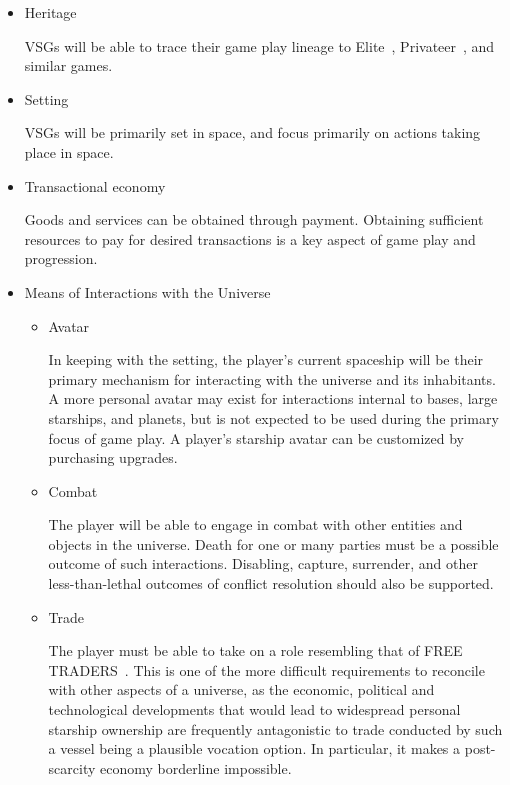 \begin{itemize}

\item Heritage

VSGs will be able to trace their game play lineage to Elite~\cite{Elite},
Privateer~\cite{Privateer}, and similar games.

\item Setting

VSGs will be primarily set in space, and focus primarily on actions
taking place in space.

\item Transactional economy

Goods and services can be obtained through payment. Obtaining
sufficient resources to pay for desired transactions is a key aspect
of game play and progression.

\item Means of Interactions with the Universe

\begin{itemize}
\item Avatar

In keeping with the setting, the player's current spaceship will be
their primary mechanism for interacting with the universe and its
inhabitants. A more personal avatar may exist for interactions
internal to bases, large starships, and planets, but is not expected
to be used during the primary focus of game play. A player's
starship avatar can be customized by purchasing upgrades.

\item Combat

The player will be able to engage in combat with other entities and
objects in the universe. Death for one or many parties must be a
possible outcome of such interactions. Disabling, capture, surrender,
and other less-than-lethal outcomes of conflict resolution should also
be supported.

\item Trade

The player must be able to take on a role resembling that of FREE
TRADERS~\cite{TOUGHGUIDE}. This is one of the more difficult
requirements to reconcile with other aspects of a universe, as the
economic, political and technological developments that would lead to
widespread personal starship ownership are frequently antagonistic to
trade conducted by such a vessel being a plausible vocation option. In
particular, it makes a post-scarcity economy borderline impossible.


\end{itemize}
\end{itemize}
